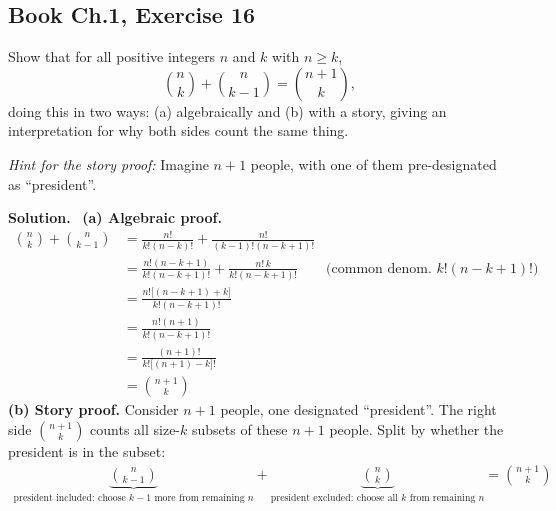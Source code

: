 \documentclass[11pt]{article}
\newcommand{\Sol}{\vspace{2pt}\noindent\textbf{Solution.}\ }
\begin{document}
\subsection{Book Ch.1, Exercise 16}
\begin{qbox}
Show that for all positive integers $n$ and $k$ with $n\ge k$,
\[
\binom{n}{k}+\binom{n}{k-1}=\binom{n+1}{k},
\]
doing this in two ways: (a) algebraically and (b) with a story, giving an interpretation for why both sides count the same thing.

\emph{Hint for the story proof:} Imagine $n+1$ people, with one of them pre-designated as ``president''.
\end{qbox}
\Sol
\textbf{(a) Algebraic proof.}
\begin{align*}
\binom{n}{k}+\binom{n}{k-1}
&= \frac{n!}{k!(n-k)!}+\frac{n!}{(k-1)!(n-k+1)!}\\[2pt]
&= \frac{n!(n-k+1)}{k!(n-k+1)!}+\frac{n!\,k}{k!(n-k+1)!} \qquad \text{(common denom.\ } k!(n-k+1)!\text{)}\\[2pt]
&= \frac{n!\big[(n-k+1)+k\big]}{k!(n-k+1)!}\\[2pt]
&= \frac{n!(n+1)}{k!(n-k+1)!}\\[2pt]
&= \frac{(n+1)!}{k!\big[(n+1)-k\big]!}\\[2pt]
&= \binom{n+1}{k}
\end{align*}
\textbf{(b) Story proof.} Consider $n+1$ people, one designated ``president''. The right side $\binom{n+1}{k}$ counts all size-$k$ subsets of these $n+1$ people. Split by whether the president is in the subset:
\begin{align*}
\underbrace{\binom{n}{k-1}}_{\text{president included: choose }k-1\text{ more from remaining }n} + \underbrace{\binom{n}{k}}_{\text{president excluded: choose all }k\text{ from remaining }n} = \binom{n+1}{k}
\end{align*}

\end{document}
